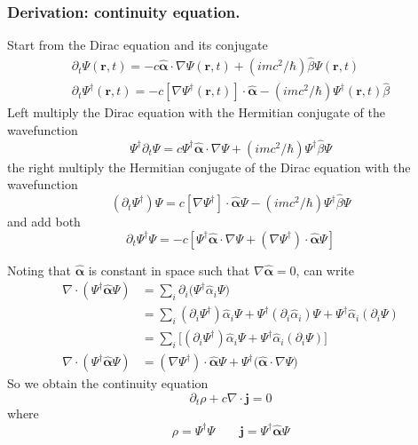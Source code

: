 \documentclass[../../../main.tex]{subfiles}
\begin{document}
\subsubsection{Derivation: continuity equation.}
Start from the Dirac equation and its conjugate
\begin{gather*}
    \partial_t \Psi(\mathbf{r},t)=-c\hat{\boldsymbol{\alpha}}\cdot\nabla \Psi(\mathbf{r},t)
    + (i m c^{2}/\hbar )\hat{\beta} \Psi(\mathbf{r},t) \\
    \partial_t \Psi ^\dagger(\mathbf{r},t)=-c [\nabla \Psi ^\dagger(\mathbf{r},t)] \cdot \hat{\boldsymbol{\alpha}}
    -(i m c^{2}/\hbar )\Psi ^\dagger(\mathbf{r},t) \hat{\beta}
\end{gather*}
Left multiply the Dirac equation with the Hermitian conjugate of the wavefunction
\begin{equation*}
    \Psi ^\dagger \partial_t \Psi=c\Psi ^\dagger\hat{\boldsymbol{\alpha}}\cdot\nabla \Psi
    + (i m c^{2}/\hbar ) \Psi ^\dagger \hat{\beta} \Psi
\end{equation*}
the right multiply the Hermitian conjugate of the Dirac equation with the wavefunction
\begin{equation*}
    (\partial_t \Psi ^\dagger) \Psi=c [\nabla \Psi ^\dagger] \cdot \hat{\boldsymbol{\alpha}}\Psi
    -(i m c^{2}/\hbar )\Psi ^\dagger \hat{\beta} \Psi
\end{equation*}
and add both
\begin{equation*}
    \partial_t \Psi ^\dagger\Psi
    = -c \left[     \Psi ^\dagger\hat{\boldsymbol{\alpha}}\cdot\nabla \Psi + (\nabla \Psi ^\dagger) \cdot \hat{\boldsymbol{\alpha}}\Psi \right]
\end{equation*}

Noting that $\hat{\boldsymbol{\alpha}}$ is constant in space such that $\nabla \hat{\boldsymbol{\alpha}} = 0$, can write
\begin{align*}
    \nabla \cdot (\Psi ^\dagger \hat{\boldsymbol{\alpha } }\Psi)
     & = \sum_{i } \partial_i\big(\Psi^\dagger\hat{\alpha}_i\Psi\big)                                                                                      \\
     & =  \sum_{i } (\partial_i\Psi^\dagger) \hat{\alpha}_i \Psi + \Psi^\dagger(\partial_i\hat{\alpha}_i)\Psi + \Psi^\dagger\hat{\alpha}_i(\partial_i\Psi) \\
     & = \sum_i\big[(\partial_i\Psi^\dagger)\hat{\alpha}_i \Psi + \Psi^\dagger\hat{\alpha}_i(\partial_i\Psi)\big]                                          \\
    \nabla \cdot (\Psi ^\dagger \hat{\boldsymbol{\alpha } }\Psi)
     & = (\nabla\Psi^\dagger)\cdot\boldsymbol{\hat{\alpha}}\Psi + \Psi^\dagger\big(\boldsymbol{\hat{\alpha}}\cdot\nabla\Psi\big)
\end{align*}
So we obtain the continuity equation
\begin{equation*}
    \partial_t \rho + c \nabla \cdot \mathbf{j}=0
\end{equation*}
where
\begin{equation*}
    \rho  = \Psi ^\dagger\Psi \qquad
    \mathbf{j}=\Psi ^\dagger \hat{\boldsymbol{\alpha } }\Psi
\end{equation*}
\end{document}
